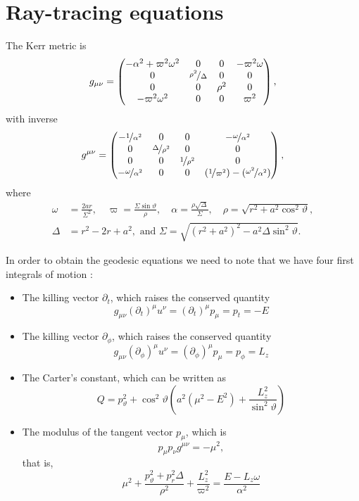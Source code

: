 \chapter{Ray-tracing equations}

The Kerr metric is
\[
	g_{\mu\nu} = \begin{pmatrix}
		-\alpha^2 + \varpi^2\omega^2 & 0 & 0 & -\varpi^2\omega \\
		0 & \nicefrac{\rho^2}{\Delta} & 0 & 0 \\
		0 & 0 & \rho^2 & 0 \\
		-\varpi^2\omega^2 & 0 & 0 & \varpi^2
	\end{pmatrix},
\]
with inverse
\[
	g^{\mu\nu} = \begin{pmatrix}
		-\nicefrac{1}{\alpha^2} & 0 & 0 & -\nicefrac{\omega}{\alpha^2} \\
		0 & \nicefrac{\Delta}{\rho^2} & 0 & 0 \\
		0 & 0 & \nicefrac{1}{\rho^2} & 0 \\
		-\nicefrac{\omega}{\alpha^2} & 0 & 0 & (\nicefrac{1}{\varpi^2}) - (\nicefrac{\omega^2}{\alpha^2})
	\end{pmatrix},
\]
where
\begin{align}
	\omega &= \frac{2ar}{\Sigma^2},  \quad \varpi = \frac{\Sigma\sin\vartheta}{\rho}, \quad \alpha = \frac{\rho\sqrt{\Delta}}{\Sigma}, \quad \rho = \sqrt{r^2 + a^2\cos^2\vartheta},\nonumber\\
	\Delta &= r^2 - 2r + a^2, \textrm{ and } \Sigma = \sqrt{(r^2+a^2)^2 - a^2\Delta\sin^2\vartheta}.
	\label{eq:termdef}
\end{align}

In order to obtain the geodesic equations we need to note that we have four first integrals of motion :
\begin{itemize}
	\item The killing vector  $\partial_t$, which raises the conserved quantity
	\[
		g_{\mu\nu}(\partial_t)^\mu u^\nu = (\partial_t)^\mu p_\mu = p_t = -E
	\]
	\item The killing vector $\partial_\phi$, which raises the conserved quantity
	\[
		g_{\mu\nu}(\partial_\phi)^\mu u^\nu = (\partial_\phi)^\mu p_\mu = p_\phi = L_z
	\]
	\item The Carter's constant, which can be written as
	\begin{equation}
		\label{eq:carter}
		Q = p_\vartheta^2 + \cos^2\vartheta \left( a^2 \left( \mu^2 - E^2 \right) + \frac{L_z^2}{\sin^2\vartheta} \right)
	\end{equation}
	\item The modulus of the tangent vector $p_\mu$, which is
	\begin{equation}
		\label{eq:modulus}
		p_\mu p_\nu g^{\mu\nu} = -\mu^2,
	\end{equation}
	that is,
	\[
		\mu^2 + \frac{p_\vartheta^2 + p_r^2 \Delta}{\rho^2} + \frac{L_z^2}{\varpi^2} = \frac{E - L_z \omega}{\alpha^2}
	\]
\end{itemize}

